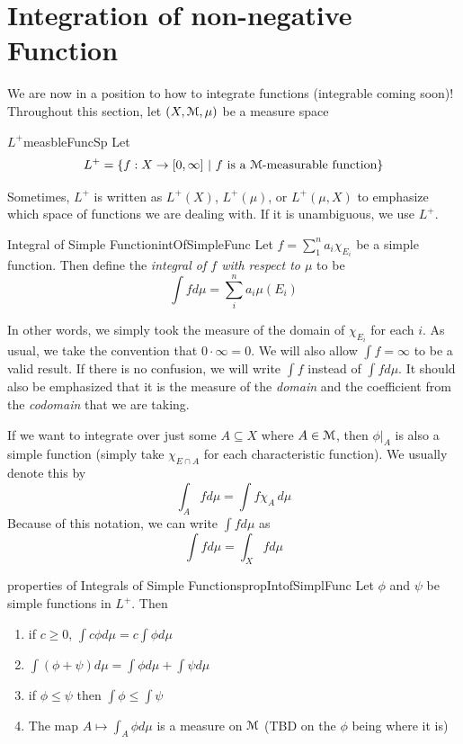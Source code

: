 \documentclass[oneside]{book}
\newcommand{\EM}{\EuScript{M}}
\newcommand{\sse}{\subseteq}
\newcommand{\set}[2]{\left\{#1 \ \middle|\ #2\right\}}
\newcommand{\rw}{\rightarrow}
\begin{document}
\section{Integration of non-negative Function}

We are now in a position to how to integrate functions (integrable coming soon)! Throughout this section, let $(X, \EM, \mu)$ be a measure space

\begin{defn}{$L^+$}{measbleFuncSp}
	Let 
	\[
		L^+ = \set{f: X \rw [0, \infty]}{\text{$f$ is a $\EM$-measurable function}}
	\]
\end{defn}

Sometimes, $L^+$ is written as $L^+(X)$, $L^+(\mu)$, or $L^+(\mu, X)$ to emphasize which space of functions we are
dealing with. If it is unambiguous, we use $L^+$. 

\begin{defn}{Integral of Simple Function}{intOfSimpleFunc}
	Let $f = \sum_1^n a_i\chi_{E_i}$ be a simple function. Then define the \emph{integral of $f$ with respect to $\mu$} to be
	\[
		\int fd\mu = \sum_i^n a_i\mu(E_i)
	\]
\end{defn}

In other words, we simply took the measure of the domain of $\chi_{E_i}$ for each $i$. As usual, we take the convention
that $0\cdot \infty = 0$. We will also allow $\int f = \infty$ to be a valid result. If there is no confusion, we will
write $\int f$ instead of $\int fd\mu$. It should also be emphasized that it is the measure of the \emph{domain} and the
coefficient from the \emph{codomain} that we are taking. 

If we want to integrate over just some $A \sse X$ where $A \in \EM$, then $\left.\phi\right|_{A}$ is also a simple
function (simply take $\chi_{E\cap A}$ for each characteristic function). We usually denote this by
\[
	\int_A fd\mu = \int f\chi_A\, d\mu
\]
Because of this notation, we can write $\int fd\mu$ as 
\[
	\int f d\mu = \int_X fd\mu
\]

\begin{prop}{properties of Integrals of Simple Functions}{propIntofSimplFunc}
	Let $\phi$ and $\psi$ be simple functions in $L^+$. Then
	\begin{enumerate}
		\item if $c \ge 0$, $\int c\phi d\mu = c\int \phi d\mu$
		\item $\int(\phi + \psi)d\mu = \int \phi d\mu + \int \psi d\mu$
		\item if $\phi \le \psi$ then $\int \phi \le \int \psi$
		\item The map $A \mapsto \int_A \phi d\mu$ is a measure on $\EM$ (TBD on the $\phi$ being where it is)
	\end{enumerate}
\end{prop}
\end{document}
